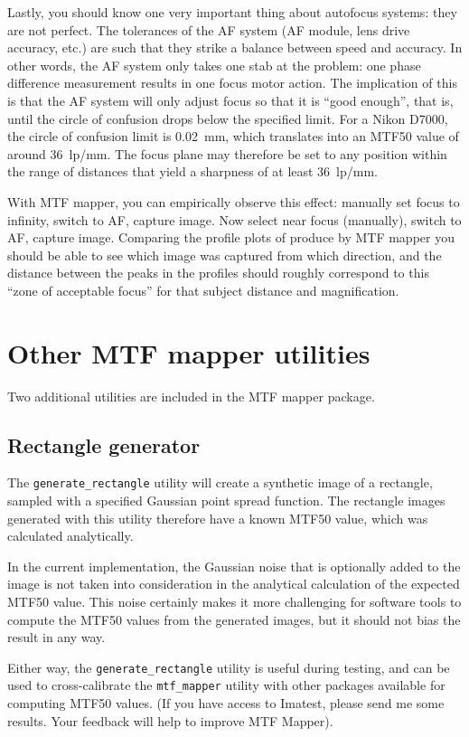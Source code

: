 \documentclass[a4paper]{article}
\begin{document}
Lastly, you should know one very important thing about autofocus systems:
they are not perfect. The tolerances of the AF system (AF module, lens
drive accuracy, etc.) are such that they strike a balance between speed and
accuracy. In other words, the AF system only takes one stab at the problem:
one phase difference measurement results in one focus motor action. The
implication of this is that the AF system will only adjust focus so that it 
is ``good enough'', that is, until the circle of confusion drops below the 
specified limit. For a Nikon D7000, the circle of
confusion limit is 0.02~mm, which translates into an MTF50 value of around
36~lp/mm. The focus plane may therefore be set to any position within the
range of distances that yield a sharpness of at least 36~lp/mm.

With MTF mapper, you can empirically observe this effect:
manually set focus to infinity, switch to AF, capture image. Now select near
focus (manually), switch to AF, capture image. Comparing the profile plots
of produce by MTF mapper you should be able to see which image was captured
from which direction, and the distance between the peaks in the profiles
should roughly correspond to this ``zone of acceptable focus'' for that
subject distance and magnification.


\section{Other MTF mapper utilities}
Two additional utilities are included in the MTF mapper package.
\subsection{Rectangle generator}
\label{sec:rectangle_generator}
The \texttt{generate\_rectangle} utility will create a synthetic image of a
rectangle, sampled with a specified Gaussian point spread function. The
rectangle images generated with this utility therefore have a known MTF50
value, which was calculated analytically.

In the current implementation, the Gaussian noise that is optionally added
to the image is not taken into consideration in the analytical calculation
of the expected MTF50 value. This noise certainly makes it more challenging
for software tools to compute the MTF50 values from the generated images,
but it should not bias the result in any way. 

Either way, the \texttt{generate\_rectangle} utility is useful during
testing, and can be used to cross-calibrate the \texttt{mtf\_mapper} utility
with other packages available for computing MTF50 values. (If you have
access to Imatest, please send me some results. Your feedback will help to
improve MTF Mapper).
\end{document}
